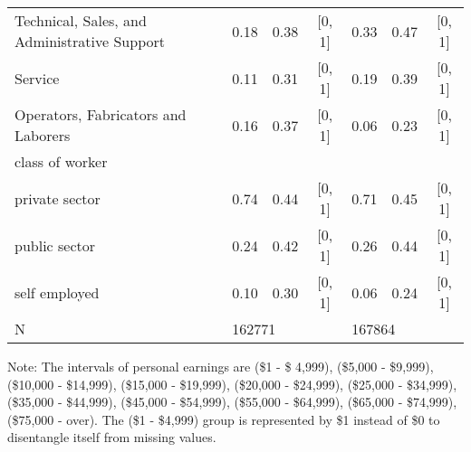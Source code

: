 \documentclass{article}
\begin{document}
\begin{flushleft}
{{\begin{tabular}{lcccccc}
Technical, Sales, and Administrative Support & 0.18 & 0.38 & [0, 1] & 0.33 & 0.47 & [0, 1]\\
Service & 0.11 & 0.31 & [0, 1] & 0.19 & 0.39 & [0, 1] \\
Operators, Fabricators and Laborers & 0.16 & 0.37 & [0, 1] & 0.06 & 0.23 & [0, 1] \\
{class of worker}  \\
private sector & 0.74 & 0.44 & [0, 1] & 0.71 & 0.45 & [0, 1] \\
public sector & 0.24 & 0.42 & [0, 1] & 0.26 & 0.44 & [0, 1]\\
self employed & 0.10 & 0.30 & [0, 1] & 0.06 & 0.24 & [0, 1] \\
N & \multicolumn{3}{l}{162771} & \multicolumn{3}{l}{167864} \\
\cline{2-4} \cline{5-7} 
\end{tabular}}}
\end{flushleft}
\vspace{-0.1cm}
\begin{footnotesize}Note: The intervals of personal earnings are (\$1 - \$ 4,999), (\$5,000 - \$9,999), (\$10,000 - \$14,999), (\$15,000 - \$19,999),  (\$20,000 - \$24,999), (\$25,000 - \$34,999), (\$35,000 - \$44,999), (\$45,000 - \$54,999), (\$55,000 - \$64,999), (\$65,000 - \$74,999), (\$75,000 - over). The (\$1 - \$4,999) group is represented by \$1 instead of \$0 to disentangle itself from missing values.
\end{footnotesize}
\\
\end{document}
